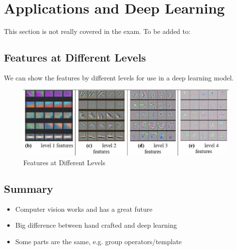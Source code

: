 \section{Applications and Deep Learning}
This section is not really covered in the exam. To be added to:

\subsection{Features at Different Levels}
We can show the features by different levels for use in a deep learning model.

\begin{figure}[!h]
    \centering
    \includegraphics[scale=0.6]{Images/featurelevels.png}
    \caption{Features at Different Levels}
    \label{fig:my_label}
\end{figure}

\subsection{Summary}

\begin{itemize}
    \itemsep0em
    \item Computer vision works and has a great future
    \item Big difference between hand crafted and deep learning
    \item Some parts are the same, e.g. group operators/template
\end{itemize}